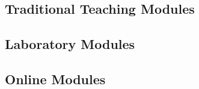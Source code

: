 \documentclass[../../../main.tex]{subfiles}
\begin{document}
\subsection{Traditional Teaching Modules}
\label{sec:tt}

\subsection{Laboratory Modules}
\label{sec:la}

\subsection{Online Modules}
\label{sec:ola}
\end{document}
